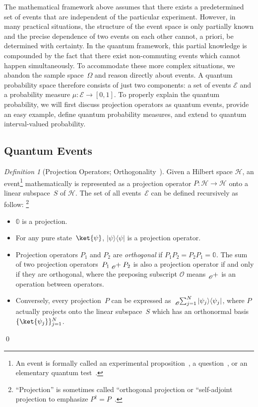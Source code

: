 \documentclass{article}
\theoremstyle{remark}
\newtheorem{definition}{Definition}
\newcommand{\events}{\ensuremath{\mathcal{E}}}
\newcommand{\qevents}{\ensuremath{\mathcal{E}}}
\newcommand{\Hilb}{\mathcal{H}}
\newcommand{\proj}[1]{|#1 \rangle\langle #1 |}
\begin{document}
The mathematical framework above assumes that there exists a predetermined
set of events that are independent of the particular experiment. However,
in many practical situations, the structure of the event space is
only partially known and the precise dependence of two events on each
other cannot, a priori, be determined with certainty. In the quantum
framework, this partial knowledge is compounded by the fact that there
exist non-commuting events which cannot happen simultaneously. To
accommodate these more complex situations, we abandon the sample space~$\Omega$
and reason directly about events. A quantum probability space therefore
consists of just two components: a set of events $\qevents$ and a
probability measure $\mu:\qevents\rightarrow[0,1]$. To properly explain
the quantum probability, we will first discuss projection operators
as quantum events, provide an easy example, define quantum probability
measures, and extend to quantum interval-valued probability.

\subsection{Quantum Events}

\begin{definition}[Projection Operators; Orthogonality~\cite{10.2307/2308516,Redhead1987-REDINA,peres1995quantum,Griffiths2003,Swart2013}]
\label{def:Projection} Given a Hilbert space $\Hilb$, an event\footnote{An event is formally called an experimental proposition~\cite{BirkhoffVonNeumann1936},
a question~\cite{10.2307/2308516,DBLP:journals/corr/abs-0910-2393},
or an elementary quantum test~\cite{peres1995quantum}.} mathematically is represented as a projection operator $P:\Hilb\rightarrow\Hilb$
onto a linear subspace~$S$ of $\Hilb$. The set of all events~$\events$
can be defined recursively as follow: \footnote{``Projection'' is sometimes called ``orthogonal projection\textquotedbl{}
or ``self-adjoint projection\textquotedbl{} to emphasize $P^{\dagger}=P$~\cite{Griffiths2003,Maassen2010}.} 
\begin{itemize}
\item $\mathbb{0}$ is a projection. 
\item For any pure state~$\ket{\psi}$, $\proj{\psi}$ is a projection
operator. 
\item Projection operators $P_{1}$ and $P_{2}$ are \emph{orthogonal} if
$P_{1}P_{2}=P_{2}P_{1}=\mathbb{0}$. The sum of two projection operators~$P_{1}\tensor*[_{\mathscr{O}}]{+}{}P_{2}$
is also a projection operator if and only if they are orthogonal,
where the preposing subscript $\mathscr{O}$ means $\tensor*[_{\mathscr{O}}]{+}{}$
is an operation between operators. 
\item Conversely, every projection~$P$ can be expressed as $\tensor*[_{\mathscr{O}}]{\sum}{_{j=1}^{N}}\proj{\psi_{j}}$,
where $P$ actually projects onto the linear subspace~$S$ which
has an orthonormal basis~$\{\ket{\psi_{j}}\}_{j=1}^{N}$. 
\end{itemize}
\qed\end{definition}
\end{document}
